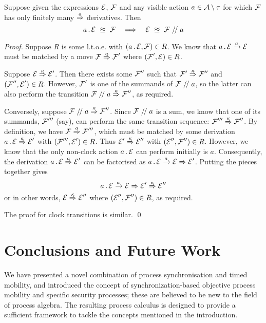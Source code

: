\documentclass[orivec,envcountsame]{llncs}
\begin{document}
\begin{theorem}
\label{thm:cancellation}

Suppose given the expressions $\text{$\mathcal{E}$}$, $\text{$\mathcal{F}$}$ and any visible action
$a \in \text{$\mathcal{A}$}\setminus\tau$ for which $\text{$\mathcal{F}$}$ has only finitely many
$\stackrel{a}{\Rightarrow}$ derivatives. Then
\[
    a\,.\,\text{$\mathcal{E}$} ~\approxeq~ \text{$\mathcal{F}$} 
    \quad\Longrightarrow\quad 
    \text{$\mathcal{E}$} ~\approxeq~ \text{$\mathcal{F}$}\mathrel{/\!/} a
\]
\end{theorem}
\begin{proof}

Suppose $R$ is some l.t.o.e. with $(a\,.\,\text{$\mathcal{E}$},\text{$\mathcal{F}$}) \in R$. We know
that $a\,.\,\text{$\mathcal{E}$} \xrightarrow{a} \text{$\mathcal{E}$}$ must be matched by a move $\text{$\mathcal{F}$}
\stackrel{a}{\Rightarrow} \text{$\mathcal{F}$}'$ where $(\text{$\mathcal{F}$}', \text{$\mathcal{E}$}) \in R$.

Suppose $\text{$\mathcal{E}$} \stackrel{\kappa}{\Rightarrow} \text{$\mathcal{E}$}'$. Then there exists some $\text{$\mathcal{F}$}''$
such that $\text{$\mathcal{F}$}' \stackrel{\kappa}{\Rightarrow} \text{$\mathcal{F}$}''$ and $(\text{$\mathcal{F}$}'',\text{$\mathcal{E}$}') \in
R$. However, $\text{$\mathcal{F}$}'$ is one of the summands of $\text{$\mathcal{F}$}\mathrel{/\!/} a$, so
the latter can also perform the transition $\text{$\mathcal{F}$}\mathrel{/\!/} a
\stackrel{\kappa}{\Rightarrow} \text{$\mathcal{F}$}''$, as required.

Conversely, suppose $\text{$\mathcal{F}$}\mathrel{/\!/} a \stackrel{\kappa}{\Rightarrow} \text{$\mathcal{F}$}''$. Since
$\text{$\mathcal{F}$}\mathrel{/\!/} a$ is a sum, we know that one of its summands,
$\text{$\mathcal{F}$}'''$ (say), can perform the same transition sequence: $\text{$\mathcal{F}$}'''
\stackrel{\kappa}{\Rightarrow} \text{$\mathcal{F}$}''$. By definition, we have $\text{$\mathcal{F}$} \stackrel{a}{\Rightarrow}
\text{$\mathcal{F}$}'''$, which must be matched by some derivation $a\,.\,\text{$\mathcal{E}$}
\stackrel{a}{\Rightarrow} \text{$\mathcal{E}$}'$ with $(\text{$\mathcal{F}$}''', \text{$\mathcal{E}$}') \in R$. Thus $\text{$\mathcal{E}$}'
\stackrel{\kappa}{\Rightarrow} \text{$\mathcal{E}$}''$ with $(\text{$\mathcal{E}$}'',\text{$\mathcal{F}$}'') \in R$. However, we know
that the only non-clock action $a\,.\,\text{$\mathcal{E}$}$ can perform initially is
$a$. Consequently, the derivation $a\,.\,\text{$\mathcal{E}$} \stackrel{a}{\Rightarrow} \text{$\mathcal{E}$}'$ can be
factorised as $a\,.\,\text{$\mathcal{E}$} \xrightarrow{a} \text{$\mathcal{E}$} \mathrel{\Rightarrow} \text{$\mathcal{E}$}'$. Putting the
pieces together gives
\[
    a\,.\,\text{$\mathcal{E}$} \xrightarrow{a} \text{$\mathcal{E}$} \mathrel{\Rightarrow} \text{$\mathcal{E}$}' \stackrel{\kappa}{\Rightarrow} \text{$\mathcal{E}$}''
\]
or in other words, $\text{$\mathcal{E}$}\stackrel{\kappa}{\Rightarrow} \text{$\mathcal{E}$}''$ where $(\text{$\mathcal{E}$}'',\text{$\mathcal{F}$}'') \in R$, as required.

The proof for clock transitions is similar.  \qed \end{proof}

\section{Conclusions and Future Work}
\label{futurework}

We have presented a novel combination of process synchronisation and
timed mobility, and introduced the concept of synchronization-based
objective process mobility and specific security processes; these are
believed to be new to the field of process algebra.  The resulting
process calculus is designed to provide a sufficient framework to tackle
the concepts mentioned in the introduction.
\end{document}
